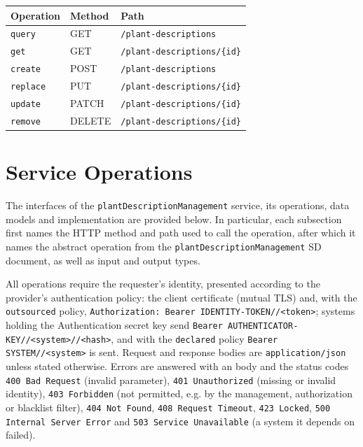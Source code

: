 \documentclass[a4paper]{arrowhead}
\newcommand{\mref}[2][]{{\textcolor{ArrowheadPurple}{\hyperref[sec:model:#2]{\ifstrempty{#1}{#2}{#1}}}}}
\begin{document}
\noindent\begin{longtable}{| p{5.2cm} | p{1.6cm} | p{8.4cm} |} \hline
\rowcolor{gray!33} Operation & Method & Path \\ \hline \endhead
\texttt{query} & GET & \texttt{/\allowbreak{}plant-\allowbreak{}descriptions} \\ \hline
\texttt{get} & GET & \texttt{/\allowbreak{}plant-\allowbreak{}descriptions/\allowbreak{}\{id\}} \\ \hline
\texttt{create} & POST & \texttt{/\allowbreak{}plant-\allowbreak{}descriptions} \\ \hline
\texttt{replace} & PUT & \texttt{/\allowbreak{}plant-\allowbreak{}descriptions/\allowbreak{}\{id\}} \\ \hline
\texttt{update} & PATCH & \texttt{/\allowbreak{}plant-\allowbreak{}descriptions/\allowbreak{}\{id\}} \\ \hline
\texttt{remove} & DELETE & \texttt{/\allowbreak{}plant-\allowbreak{}descriptions/\allowbreak{}\{id\}} \\ \hline
\end{longtable}

\newpage

\section{Service Operations}
\label{sec:operations}

The interfaces of the \texttt{plant\allowbreak{}Description\allowbreak{}Management} service, its operations, data models and implementation are provided below.
In particular, each subsection first names the HTTP method and path used to call the operation, after which it names the abstract operation from the \texttt{plant\allowbreak{}Description\allowbreak{}Management} SD document, as well as input and output types.

All operations require the requester's identity, presented according to the provider's authentication policy: the client certificate (mutual TLS) and, with the \texttt{outsourced} policy, \texttt{Authorization: Bearer IDENTITY-TOKEN//<token>}; systems holding the Authentication secret key send \texttt{Bearer AUTHENTICATOR-KEY//<system>//<hash>}, and with the \texttt{declared} policy \texttt{Bearer SYSTEM//<system>} is sent. Request and response bodies are \texttt{application/json} unless stated otherwise.
Errors are answered with an \mref{ErrorMessage} body and the status codes \texttt{400 Bad Request} (invalid parameter), \texttt{401 Unauthorized} (missing or invalid identity), \texttt{403 Forbidden} (not permitted, e.g. by the management, authorization or blacklist filter), \texttt{404 Not Found}, \texttt{408 Request Timeout}, \texttt{423 Locked}, \texttt{500 Internal Server Error} and \texttt{503 Service Unavailable} (a system it depends on failed).
\end{document}
